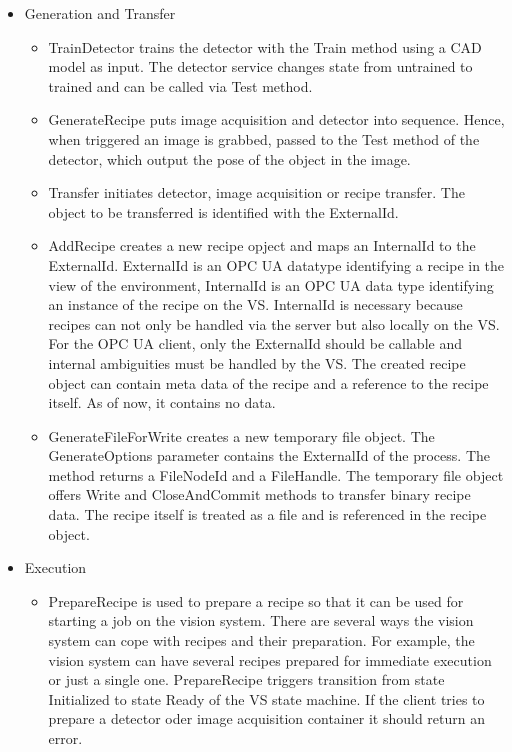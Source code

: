 \begin{itemize}
    \item Generation and Transfer
    \begin{itemize}
        \item TrainDetector trains the detector with the Train method using a CAD model as input. The detector service changes state from untrained to trained and can be called via Test method.
        \item GenerateRecipe puts image acquisition and detector into sequence. Hence, when triggered an image is grabbed, passed to the Test method of the detector, which output the pose of the object in the image.
        \item Transfer initiates detector, image acquisition or recipe transfer. The object to be transferred is identified with the ExternalId.
        \item AddRecipe creates a new recipe opject and maps an InternalId to the ExternalId. ExternalId is an OPC UA datatype identifying a recipe in the view of the environment, InternalId is an OPC UA data type identifying an instance of the recipe on the VS.  InternalId is necessary because recipes can not only be handled via the server but also locally on the VS. For the OPC UA client, only the ExternalId should be callable and internal ambiguities must be handled by the VS. The created recipe object can contain meta data of the recipe and a reference to the recipe itself. As of now, it contains no data.
    	\item GenerateFileForWrite creates a new temporary file object. The GenerateOptions parameter contains the ExternalId of the process. The method returns a FileNodeId and a FileHandle. The temporary file object offers Write and CloseAndCommit methods to transfer binary recipe data. The recipe itself is treated as a file and is referenced in the recipe object.
    \end{itemize}
    \item Execution
    \begin{itemize}
    	\item PrepareRecipe is used to prepare a recipe so that it can be used for starting a job on the vision system. There are several ways the vision system can cope with recipes and their preparation. For example, the vision system can have several recipes prepared for immediate execution or just a single one. PrepareRecipe triggers transition from state Initialized to state Ready of the VS state machine. If the client tries to prepare a detector oder image acquisition container it should return an error.

\end{itemize}
\end{itemize}
